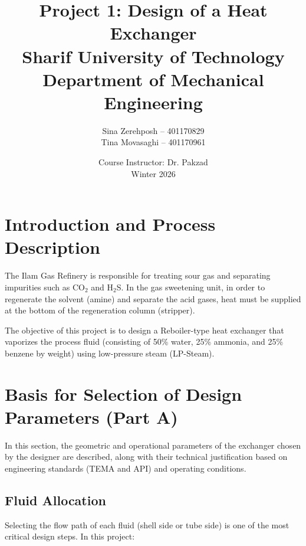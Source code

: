 \documentclass[12pt]{article}
\title{\textbf{Project 1: Design of a Heat Exchanger} \\[0.3em] \large Sharif University of Technology \\ Department of Mechanical Engineering}
\author{Sina Zerehposh -- 401170829 \\ Tina Movasaghi -- 401170961}
\date{Course Instructor: Dr. Pakzad \\ Winter 2026}
\begin{document}
\maketitle

\section{Introduction and Process Description}

The Ilam Gas Refinery is responsible for treating sour gas and separating impurities such as CO$_2$ and H$_2$S. In the gas sweetening unit, in order to regenerate the solvent (amine) and separate the acid gases, heat must be supplied at the bottom of the regeneration column (stripper).

The objective of this project is to design a Reboiler-type heat exchanger that vaporizes the process fluid (consisting of 50\% water, 25\% ammonia, and 25\% benzene by weight) using low-pressure steam (LP-Steam).

\section{Basis for Selection of Design Parameters (Part A)}

In this section, the geometric and operational parameters of the exchanger chosen by the designer are described, along with their technical justification based on engineering standards (TEMA and API) and operating conditions.

\subsection{Fluid Allocation}

Selecting the flow path of each fluid (shell side or tube side) is one of the most critical design steps. In this project:
\end{document}
